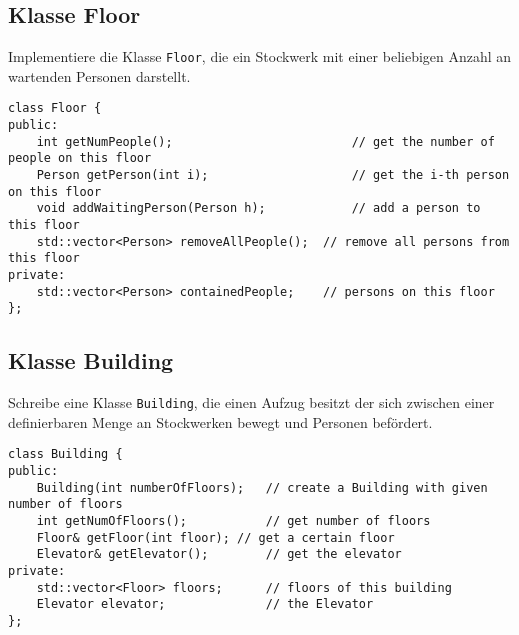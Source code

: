 

\subsection{Klasse Floor}
Implementiere die Klasse \texttt{Floor}, die ein Stockwerk mit einer beliebigen Anzahl an wartenden Personen darstellt.

\begin{lstlisting}
class Floor {
public:
	int getNumPeople();							// get the number of people on this floor
	Person getPerson(int i);					// get the i-th person on this floor
	void addWaitingPerson(Person h);			// add a person to this floor
	std::vector<Person> removeAllPeople();	// remove all persons from this floor
private:
	std::vector<Person> containedPeople;	// persons on this floor
};
\end{lstlisting}

\subsection{Klasse Building}
Schreibe eine Klasse \texttt{Building}, die einen Aufzug besitzt der sich zwischen einer definierbaren Menge an Stockwerken bewegt und Personen befördert.

\begin{lstlisting}
class Building {
public:
	Building(int numberOfFloors);	// create a Building with given number of floors
	int getNumOfFloors();			// get number of floors
	Floor& getFloor(int floor);	// get a certain floor
	Elevator& getElevator();		// get the elevator
private:
	std::vector<Floor> floors;		// floors of this building
	Elevator elevator;				// the Elevator
};
\end{lstlisting}


